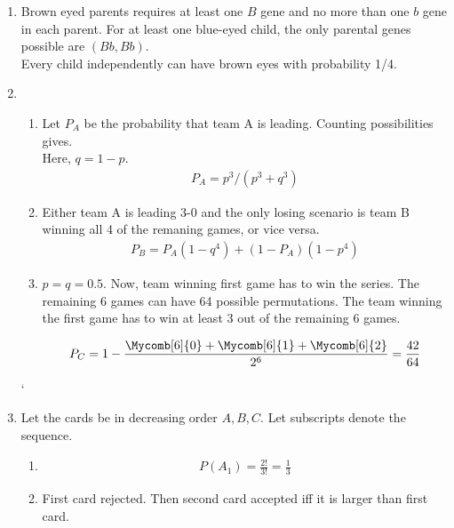 \begin{enumerate}
	
	\item Brown eyed parents requires at least one $ B $ gene and no more than one $ b $ gene in each parent. For at least one blue-eyed child, the only parental genes possible are $ (Bb, Bb) $.\\
	Every child independently can have brown eyes with probability 1/4.\\
	
	\item \begin{enumerate}
		\item Let $ P_A $ be the probability that team A is leading. Counting possibilities gives. \\
		Here, $ q = 1-p $. 
		\begin{align}
			P_A = p^3 / (p^3 + q^3)
		\end{align}
		
		\item Either team A is leading 3-0 and the only losing scenario is team B winning all 4 of the remaning games, or vice versa. 
		\begin{align}
			P_B = P_A (1 - q^4) + (1 - P_A)(1 - p^4)
		\end{align}
		
		\item $ p = q = 0.5 $. Now, team winning first game has to win the series.
		The remaining 6 games can have 64 possible permutations. The team winning the first game has to win at least 3 out of the remaining 6 games. 
		
		\begin{align}
			P_C = 1 - \frac{\Mycomb[6]{0} + \Mycomb[6]{1} + \Mycomb[6]{2} }{2^6} = \frac{42}{64}
		\end{align}
		
	\end{enumerate}
	
	`	\item Let the cards be in decreasing order $ A, B, C $. Let subscripts denote the sequence.\\
	\begin{enumerate}
		\item \begin{align}
			P(A_1) = \frac{2!}{3!} = \frac{1}{3}
		\end{align}
		
		\item First card rejected. Then second card accepted iff it is larger than first card.\\
		

\end{enumerate}
\end{enumerate}
